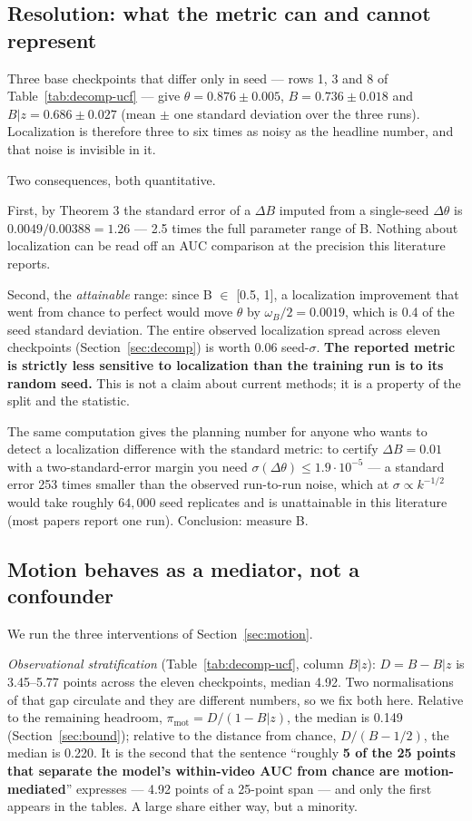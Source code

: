 \documentclass[number,preprint,12pt]{elsarticle}
\begin{document}
\subsection{Resolution: what the metric can and cannot represent}\label{sec:resolution}

Three base checkpoints that differ only in seed --- rows 1, 3 and 8 of
Table~\ref{tab:decomp-ucf} --- give \(\theta=0.876\pm0.005\), \(B=0.736\pm0.018\) and
\(B|z=0.686\pm0.027\) (mean \(\pm\) one standard deviation over the three runs).
Localization is therefore three to six times as noisy as the headline number,
and that noise is invisible in it.

Two consequences, both quantitative.

First, by Theorem 3 the standard error of a \(\Delta B\) imputed from a single-seed \(\Delta\theta\)
is \(0.0049/0.00388=1.26\) --- 2.5 times the full parameter range of B. Nothing
about localization can be read off an AUC comparison at the precision this
literature reports.

Second, the \emph{attainable} range: since B \(\in\) {[}0.5, 1{]}, a localization improvement
that went from chance to perfect would move \(\theta\) by \(\omega_B/2=0.0019\), which is 0.4
of the seed standard deviation. The entire observed localization spread across
eleven checkpoints (Section~\ref{sec:decomp}) is worth 0.06 seed-\(\sigma\). \textbf{The reported metric is
strictly less sensitive to localization than the training run is to its random
seed.} This is not a claim about current methods; it is a property of the split
and the statistic.

The same computation gives the planning number for anyone who wants to detect a
localization difference with the standard metric: to certify \(\Delta B=0.01\) with a
two-standard-error margin you need \(\sigma(\Delta\theta)\le 1.9\cdot10^{-5}\) --- a
standard error 253 times smaller than the observed run-to-run noise, which at
\(\sigma\propto k^{-1/2}\) would take roughly \(64{,}000\) seed replicates and is
unattainable in this
literature (most papers report one run). Conclusion: measure B.

\subsection{Motion behaves as a mediator, not a confounder}\label{sec:mediation}

We run the three interventions of Section~\ref{sec:motion}.

\emph{Observational stratification} (Table~\ref{tab:decomp-ucf}, column \(B|z\)): \(D = B - B|z\) is 3.45--5.77
points across the eleven checkpoints, median 4.92. Two normalisations of that gap
circulate and they are different numbers, so we fix both here. Relative to the
remaining headroom, \(\pi_{\mathrm{mot}}=D/(1-B|z)\), the median is 0.149
(Section~\ref{sec:bound}); relative to the distance from chance,
\(D/(B-1/2)\), the median is 0.220. It is the second that the sentence
``roughly \textbf{5 of the 25 points that separate the model's within-video AUC from
chance are motion-mediated}'' expresses --- 4.92 points of a 25-point span ---
and only the first appears in the tables. A large share either way, but a
minority.
\end{document}
